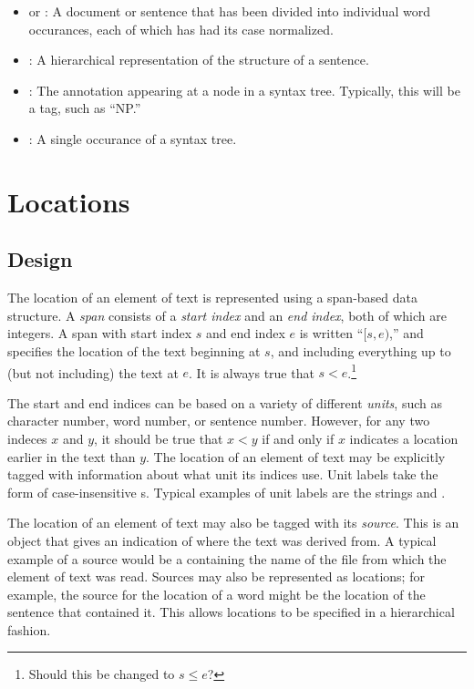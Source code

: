 \documentclass{article}
\begin{document}
\begin{itemize}
    \item {} or : A document or sentence that has been divided into
        individual word occurances, each of which has had its case
        normalized.
  
    \item {}: A hierarchical representation of the
        structure of a sentence.
  
    \item {}: The annotation appearing at a node in a
        syntax tree.  Typically, this will be a tag, such as ``NP.''
  
    \item {}: A single occurance of a syntax
        tree.
  
  \end{itemize}

\section{Locations}
\label{sec:locations}

  \subsection{Design}

  The location of an element of text is represented using a span-based
  data structure.  A \emph{span} consists of a \emph{start index} and
  an \emph{end index}, both of which are integers.  A span with start
  index $s$ and end index $e$ is written ``$[s,e)$,'' and specifies
  the location of the text beginning at $s$, and including everything
  up to (but not including) the text at $e$.  It is always true that
  $s<e$.\footnote{Should this be changed to $s\leq e$?}

  The start and end indices can be based on a variety of different
  \emph{units}, such as character number, word number, or sentence
  number.  However, for any two indeces $x$ and $y$, it should be true
  that $x<y$ if and only if $x$ indicates a location earlier in the
  text than $y$.  The location of an element of text may be explicitly
  tagged with information about what unit its indices use.  Unit
  labels take the form of case-insensitive s.  Typical
  examples of unit labels are the strings  and
  .

  The location of an element of text may also be tagged with its
  \emph{source}.  This is an object that gives an indication of where
  the text was derived from.  A typical example of a source would be a
   containing the name of the file from which the element
  of text was read.  Sources may also be represented as locations; for
  example, the source for the location of a word might be the location
  of the sentence that contained it.  This allows locations to be
  specified in a hierarchical fashion.
\end{document}
